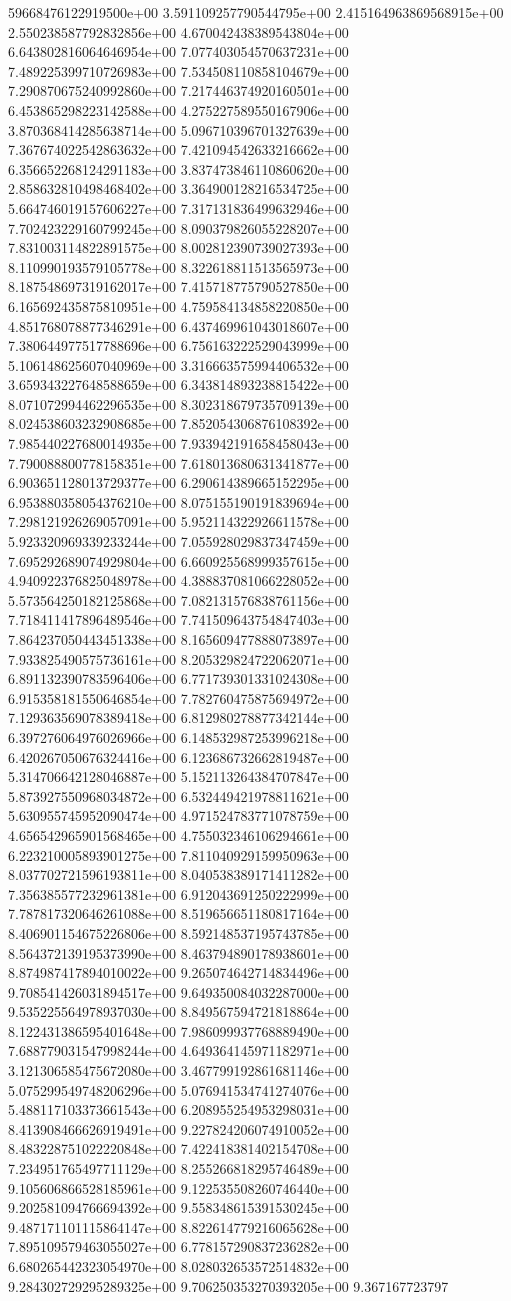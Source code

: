 59668476122919500e+00	3.591109257790544795e+00	2.415164963869568915e+00	2.550238587792832856e+00	4.670042438389543804e+00	6.643802816064646954e+00	7.077403054570637231e+00	7.489225399710726983e+00	7.534508110858104679e+00	7.290870675240992860e+00	7.217446374920160501e+00	6.453865298223142588e+00	4.275227589550167906e+00	3.870368414285638714e+00	5.096710396701327639e+00	7.367674022542863632e+00	7.421094542633216662e+00	6.356652268124291183e+00	3.837473846110860620e+00	2.858632810498468402e+00	3.364900128216534725e+00	5.664746019157606227e+00	7.317131836499632946e+00	7.702423229160799245e+00	8.090379826055228207e+00	7.831003114822891575e+00	8.002812390739027393e+00	8.110990193579105778e+00	8.322618811513565973e+00	8.187548697319162017e+00	7.415718775790527850e+00	6.165692435875810951e+00	4.759584134858220850e+00	4.851768078877346291e+00	6.437469961043018607e+00	7.380644977517788696e+00	6.756163222529043999e+00	5.106148625607040969e+00	3.316663575994406532e+00	3.659343227648588659e+00	6.343814893238815422e+00	8.071072994462296535e+00	8.302318679735709139e+00	8.024538603232908685e+00	7.852054306876108392e+00	7.985440227680014935e+00	7.933942191658458043e+00	7.790088800778158351e+00	7.618013680631341877e+00	6.903651128013729377e+00	6.290614389665152295e+00	6.953880358054376210e+00	8.075155190191839694e+00	7.298121926269057091e+00	5.952114322926611578e+00	5.923320969339233244e+00	7.055928029837347459e+00	7.695292689074929804e+00	6.660925568999357615e+00	4.940922376825048978e+00	4.388837081066228052e+00	5.573564250182125868e+00	7.082131576838761156e+00	7.718411417896489546e+00	7.741509643754847403e+00	7.864237050443451338e+00	8.165609477888073897e+00	7.933825490575736161e+00	8.205329824722062071e+00	6.891132390783596406e+00	6.771739301331024308e+00	6.915358181550646854e+00	7.782760475875694972e+00	7.129363569078389418e+00	6.812980278877342144e+00	6.397276064976026966e+00	6.148532987253996218e+00	6.420267050676324416e+00	6.123686732662819487e+00	5.314706642128046887e+00	5.152113264384707847e+00	5.873927550968034872e+00	6.532449421978811621e+00	5.630955745952090474e+00	4.971524783771078759e+00	4.656542965901568465e+00	4.755032346106294661e+00	6.223210005893901275e+00	7.811040929159950963e+00	8.037702721596193811e+00	8.040538389171411282e+00	7.356385577232961381e+00	6.912043691250222999e+00	7.787817320646261088e+00	8.519656651180817164e+00	8.406901154675226806e+00	8.592148537195743785e+00	8.564372139195373990e+00	8.463794890178938601e+00	8.874987417894010022e+00	9.265074642714834496e+00	9.708541426031894517e+00	9.649350084032287000e+00	9.535225564978937030e+00	8.849567594721818864e+00	8.122431386595401648e+00	7.986099937768889490e+00	7.688779031547998244e+00	4.649364145971182971e+00	3.121306585475672080e+00	3.467799192861681146e+00	5.075299549748206296e+00	5.076941534741274076e+00	5.488117103373661543e+00	6.208955254953298031e+00	8.413908466626919491e+00	9.227824206074910052e+00	8.483228751022220848e+00	7.422418381402154708e+00	7.234951765497711129e+00	8.255266818295746489e+00	9.105606866528185961e+00	9.122535508260746440e+00	9.202581094766694392e+00	9.558348615391530245e+00	9.487171101115864147e+00	8.822614779216065628e+00	7.895109579463055027e+00	6.778157290837236282e+00	6.680265442323054970e+00	8.028032653572514832e+00	9.284302729295289325e+00	9.706250353270393205e+00	9.367167723797